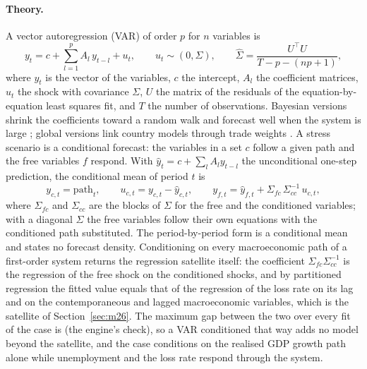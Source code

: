 \paragraph{Theory.}
A vector autoregression (VAR) of order $p$ for $n$ variables is
\begin{equation}
y_t=c+\sum_{l=1}^{p}A_l\,y_{t-l}+u_t,\qquad u_t\sim(0,\Sigma),\qquad
\hat\Sigma=\frac{U^{\top}U}{T-p-(np+1)},
\label{eq:var-model}
\end{equation}
where $y_t$ is the vector of the variables, $c$ the intercept, $A_l$ the coefficient matrices, $u_t$ the shock with covariance
$\Sigma$, $U$ the matrix of the residuals of the equation-by-equation least squares fit, and $T$ the number of observations.
Bayesian versions shrink the coefficients toward a random walk \citep{aggregation-stress:litterman1986} and forecast well when
the system is large \citep{aggregation-stress:banbura2010}; global versions link country models through trade weights
\citep{aggregation-stress:pesaran2004,aggregation-stress:dees2007}. A stress scenario is a conditional forecast: the variables in
a set $c$ follow a given path and the free variables $f$ respond. With $\hat y_t=c+\sum_l A_ly_{t-l}$ the unconditional
one-step prediction, the conditional mean of period $t$ is
\begin{equation}
y_{c,t}=\mathrm{path}_t,\qquad
u_{c,t}=y_{c,t}-\hat y_{c,t},\qquad
y_{f,t}=\hat y_{f,t}+\Sigma_{fc}\,\Sigma_{cc}^{-1}\,u_{c,t},
\label{eq:var-cond}
\end{equation}
where $\Sigma_{fc}$ and $\Sigma_{cc}$ are the blocks of $\Sigma$ for the free and the conditioned variables; with a diagonal
$\Sigma$ the free variables follow their own equations with the conditioned path substituted. The period-by-period form is a
conditional mean and states no forecast density. Conditioning on every macroeconomic path of a first-order system returns the
regression satellite itself: the coefficient $\Sigma_{fc}\Sigma_{cc}^{-1}$ is the regression of the free shock on the conditioned
shocks, and by partitioned regression the fitted value equals that of the regression of the loss rate on its lag and on the
contemporaneous and lagged macroeconomic variables, which is the satellite of Section~\ref{sec:m26}. The maximum gap
between the two over every fit of the case is {\agstGapToOls} (the engine's check), so a VAR conditioned that way adds no model beyond the satellite, and the case
conditions on the realised GDP growth path alone while unemployment and the loss rate respond through the system.


